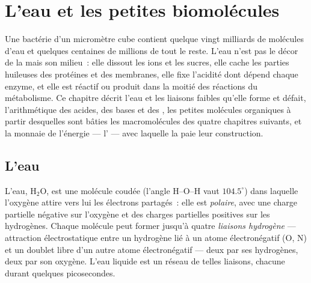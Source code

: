 \chapter{L'eau et les petites biomolécules}\label{ch:b1:water-small-molecules}

Une bactérie d'un micromètre cube contient quelque vingt milliards de
molécules d'eau et quelques centaines de millions de tout le reste.
L'eau n'est pas le décor de la  mais son milieu~: elle dissout
les ions et les sucres, elle cache les parties huileuses des protéines
et des membranes, elle fixe l'acidité dont dépend chaque enzyme, et elle
est réactif ou produit dans la moitié des réactions du métabolisme. Ce
chapitre décrit l'eau et les liaisons faibles qu'elle forme et défait,
l'arithmétique des acides, des bases et des , les petites
molécules organiques à partir desquelles sont bâties les macromolécules
des quatre chapitres suivants, et la monnaie de l'énergie --- l' ---
avec laquelle la  paie leur construction.

\section{L'eau}

\begin{definition}\label{def:b1:water-small-molecules:water}
L'eau, $\mathrm{H_2O}$, est une molécule coudée (l'angle H--O--H vaut
$104.5^\circ$) dans laquelle l'oxygène attire vers lui les électrons
partagés~: elle est \emph{polaire}, avec une
charge partielle négative sur l'oxygène et des charges partielles
positives sur les hydrogènes. Chaque molécule peut former jusqu'à quatre
\emph{liaisons hydrogène} --- attraction
électrostatique entre un hydrogène lié à un atome électronégatif (O, N)
et un doublet libre d'un autre atome électronégatif --- deux par ses
hydrogènes, deux par son oxygène. L'eau liquide est un réseau de telles
liaisons, chacune durant quelques picosecondes.
\end{definition}


